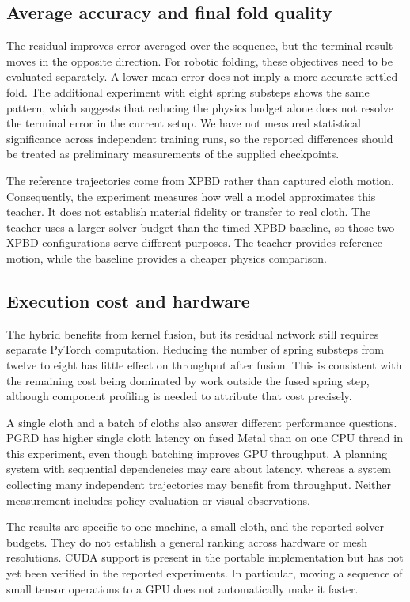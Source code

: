 \documentclass[sigconf]{acmart}
\begin{document}
\subsection{Average accuracy and final fold quality}
The residual improves error averaged over the sequence, but the terminal result moves in the opposite direction. For robotic folding, these objectives need to be evaluated separately. A lower mean error does not imply a more accurate settled fold. The additional experiment with eight spring substeps shows the same pattern, which suggests that reducing the physics budget alone does not resolve the terminal error in the current setup. We have not measured statistical significance across independent training runs, so the reported differences should be treated as preliminary measurements of the supplied checkpoints.

The reference trajectories come from XPBD rather than captured cloth motion. Consequently, the experiment measures how well a model approximates this teacher. It does not establish material fidelity or transfer to real cloth. The teacher uses a larger solver budget than the timed XPBD baseline, so those two XPBD configurations serve different purposes. The teacher provides reference motion, while the baseline provides a cheaper physics comparison.

\subsection{Execution cost and hardware}
The hybrid benefits from kernel fusion, but its residual network still requires separate PyTorch computation. Reducing the number of spring substeps from twelve to eight has little effect on throughput after fusion. This is consistent with the remaining cost being dominated by work outside the fused spring step, although component profiling is needed to attribute that cost precisely.

A single cloth and a batch of cloths also answer different performance questions. PGRD has higher single cloth latency on fused Metal than on one CPU thread in this experiment, even though batching improves GPU throughput. A planning system with sequential dependencies may care about latency, whereas a system collecting many independent trajectories may benefit from throughput. Neither measurement includes policy evaluation or visual observations.

The results are specific to one machine, a small cloth, and the reported solver budgets. They do not establish a general ranking across hardware or mesh resolutions. CUDA support is present in the portable implementation but has not yet been verified in the reported experiments. In particular, moving a sequence of small tensor operations to a GPU does not automatically make it faster.
\end{document}
